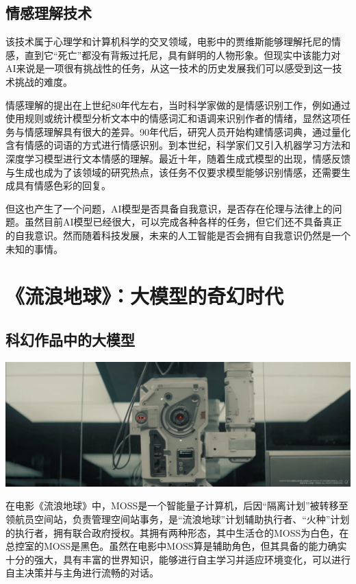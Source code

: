 \subsection{情感理解技术}

该技术属于心理学和计算机科学的交叉领域，电影中的贾维斯能够理解托尼的情感，直到它“死亡”都没有背叛过托尼，具有鲜明的人物形象。但现实中该能力对AI来说是一项很有挑战性的任务，从这一技术的历史发展我们可以感受到这一技术挑战的难度。

情感理解的提出在上世纪80年代左右，当时科学家做的是情感识别工作，例如通过使用规则或统计模型分析文本中的情感词汇和语调来识别作者的情绪，显然这项任务与情感理解具有很大的差异。90年代后，研究人员开始构建情感词典，通过量化含有情感的词语的方式进行情感识别。到本世纪，科学家们又引入机器学习方法和深度学习模型进行文本情感的理解。最近十年，随着生成式模型的出现，情感反馈与生成也成为了该领域的研究热点，该任务不仅要求模型能够识别情感，还需要生成具有情感色彩的回复。

但这也产生了一个问题，AI模型是否具备自我意识，是否存在伦理与法律上的问题。虽然目前AI模型已经很大，可以完成各种各样的任务，但它们还不具备真正的自我意识。然而随着科技发展，未来的人工智能是否会拥有自我意识仍然是一个未知的事情。

\section{《流浪地球》：大模型的奇幻时代}
\subsection{科幻作品中的大模型}

\begin{marginfigure}
    \includegraphics{images/tech_11.png}
\end{marginfigure}

在电影《流浪地球》中，MOSS是一个智能量子计算机，后因“隔离计划”被转移至领航员空间站，负责管理空间站事务，是“流浪地球”计划辅助执行者、“火种”计划的执行者，拥有联合政府授权。其拥有两种形态，其中生活仓的MOSS为白色，在总控室的MOSS是黑色。虽然在电影中MOSS算是辅助角色，但其具备的能力确实十分的强大，具有丰富的世界知识，能够进行自主学习并适应环境变化，可以进行自主决策并与主角进行流畅的对话。

